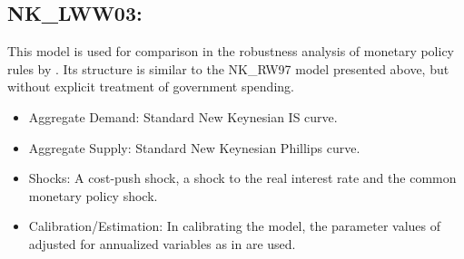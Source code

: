 \documentclass[11pt,a4paper]{article}
\begin{document}
	\subsection{NK\_LWW03: \texorpdfstring{\cite{LevinWielandWilliams2003}}{Levin et al. (2003)}}
	\label{NKLWW03}
	This model is used for comparison in the robustness analysis of monetary policy rules by \cite{LevinWielandWilliams2003}. Its structure is similar to the NK\_RW97 model presented above, but without explicit treatment of government spending.
	\begin{itemize}
		\item Aggregate Demand: Standard New Keynesian IS curve.
		\item Aggregate Supply: Standard New Keynesian Phillips curve.
		\item Shocks: A cost-push shock, a shock to the real interest rate and the common monetary policy shock.
		\item Calibration/Estimation: In calibrating the model, the parameter values of \cite{Woodford2003} adjusted for annualized variables as in     \cite{LevinWielandWilliams2003} are used.
	\end{itemize}
	
	
	
\end{document}
